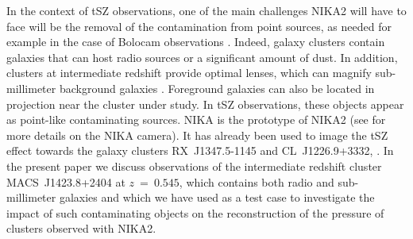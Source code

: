 \documentclass[twocolumn,traditabstract]{aa}
\begin{document}
In the context of tSZ observations, one of the main challenges NIKA2 will have to face will be the removal of the contamination from point sources, as needed for example in the case of Bolocam observations \citep{sayers2013a}. Indeed, galaxy clusters contain galaxies that can host radio sources or a significant amount of dust. In addition, clusters at intermediate redshift provide optimal lenses, which can magnify sub-millimeter background galaxies \citep[see e.g.][]{adam2014}. Foreground galaxies can also be located in projection near the cluster under study. In tSZ observations, these objects appear as point-like contaminating sources. NIKA is the prototype of NIKA2 (see \citealt{monfardini2010,bourion2011,bourrion2012,monfardini2011,calvo2012,catalano2014} for more details on the NIKA camera). It has already been used to image the tSZ effect towards the galaxy clusters \mbox{RX~J1347.5-1145} and \mbox{CL~J1226.9+3332}, \citep[see][]{adam2013,adam2014}. In the present paper we discuss observations of  the intermediate redshift cluster \mbox{MACS~J1423.8+2404} at $z~=~0.545$, which contains both radio and sub-millimeter galaxies and which we have used as a test case to investigate the impact of such contaminating objects on the reconstruction of the pressure of clusters observed with NIKA2. 
\end{document}
